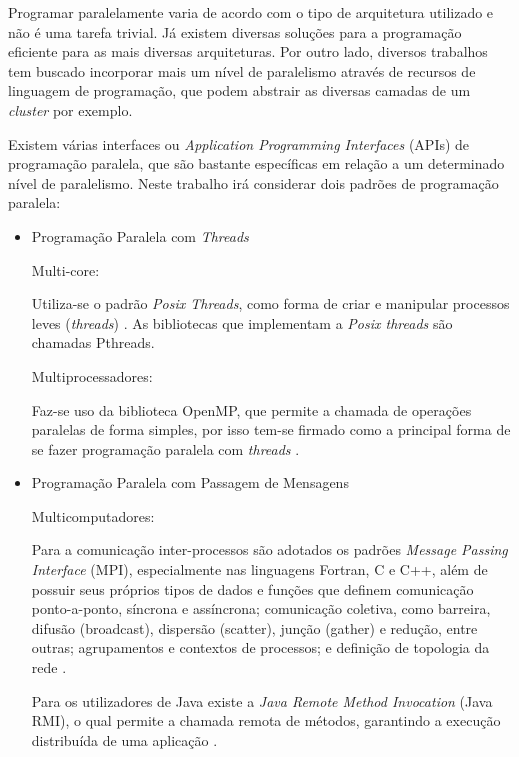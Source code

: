 Programar paralelamente varia de acordo com o tipo de arquitetura utilizado e não é uma tarefa trivial. Já existem diversas soluções para a programação eficiente para as mais diversas arquiteturas. Por outro lado, diversos trabalhos tem buscado incorporar mais um nível de paralelismo através de recursos de linguagem de programação, que podem abstrair as diversas camadas de um \textit{cluster} por exemplo.

Existem várias interfaces ou \textit{Application Programming Interfaces} (APIs) de programação paralela, que são bastante específicas em relação a um determinado nível de paralelismo. Neste trabalho irá considerar dois padrões de programação paralela:

\begin{itemize}
	
	\item Programação Paralela com \textit{Threads}  

		\subitem Multi-core:

			Utiliza-se o padrão \textit{Posix Threads}, como forma de criar e manipular processos leves (\textit{threads}) \cite{bib:andrews1999foundations}. As bibliotecas que implementam a \textit{Posix threads} são chamadas Pthreads.

		\subitem Multiprocessadores: 
	
			Faz-se uso da biblioteca OpenMP, que permite a chamada de operações paralelas de forma simples, por isso tem-se firmado como a principal forma de se fazer programação paralela com \textit{threads} \cite{bib:chandra2001parallel}.
	
	\item Programação Paralela com Passagem de Mensagens
	
		\subitem Multicomputadores:
	
			Para a comunicação inter-processos são adotados os padrões \textit{Message Passing Interface} (MPI), especialmente nas linguagens Fortran, C e C++, além de possuir seus próprios tipos de dados e funções que definem comunicação ponto-a-ponto, síncrona e assíncrona; comunicação coletiva, como barreira, difusão (broadcast), dispersão (scatter), junção (gather) e redução, entre outras; agrupamentos e contextos de processos; e definição de topologia da rede \cite{bib:gropp1996high}.
		
			Para os utilizadores de Java existe a \textit{Java Remote Method Invocation} (Java RMI), o qual permite a chamada remota de métodos, garantindo a execução distribuída de uma aplicação \cite{bib:farley1998java}.
	
\end{itemize}




